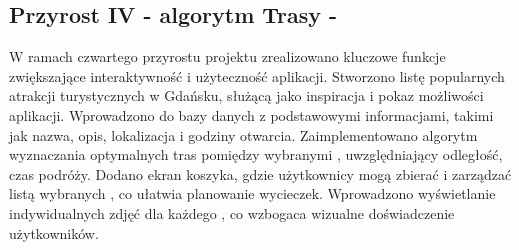 




    \subsection{Przyrost IV - algorytm Trasy - }
    \label{sec:przyrost4}
    W ramach czwartego przyrostu projektu zrealizowano kluczowe funkcje zwiększające interaktywność i użyteczność aplikacji. \newline
    \indent Stworzono listę popularnych atrakcji turystycznych w Gdańsku, służącą jako inspiracja i pokaz możliwości aplikacji. \newline
    \indent Wprowadzono do bazy danych  z podstawowymi informacjami, takimi jak nazwa, opis, lokalizacja i godziny otwarcia.
    \indent Zaimplementowano algorytm wyznaczania optymalnych tras pomiędzy wybranymi , uwzględniający odległość, czas podróży.
    \indent Dodano ekran koszyka, gdzie użytkownicy mogą zbierać i zarządzać listą wybranych , co ułatwia planowanie wycieczek.
    \indent Wprowadzono wyświetlanie indywidualnych zdjęć dla każdego , co wzbogaca wizualne doświadczenie użytkowników.






